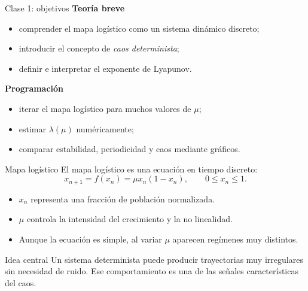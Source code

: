 \begin{frame}{Clase 1: objetivos}
\textbf{Teoría breve}
\begin{itemize}
    \item comprender el mapa logístico como un sistema dinámico discreto;
    \item introducir el concepto de \emph{caos determinista};
    \item definir e interpretar el exponente de Lyapunov.
\end{itemize}

\vspace{0.2cm}
\textbf{Programación}
\begin{itemize}
    \item iterar el mapa logístico para muchos valores de $\mu$;
    \item estimar $\lambda(\mu)$ numéricamente;
    \item comparar estabilidad, periodicidad y caos mediante gráficos.
\end{itemize}
\end{frame}

\begin{frame}{Mapa logístico}
El mapa logístico es una ecuación en tiempo discreto:
\begin{equation*}
    x_{n+1}=f(x_n)=\mu x_n(1-x_n), \qquad 0 \le x_n \le 1.
\end{equation*}

\begin{itemize}
    \item $x_n$ representa una fracción de población normalizada.
    \item $\mu$ controla la intensidad del crecimiento y la no linealidad.
    \item Aunque la ecuación es simple, al variar $\mu$ aparecen regímenes muy distintos.
\end{itemize}

\begin{block}{Idea central}
Un sistema determinista puede producir trayectorias muy irregulares sin necesidad de ruido. Ese comportamiento es una de las señales características del caos.
\end{block}
\end{frame}

